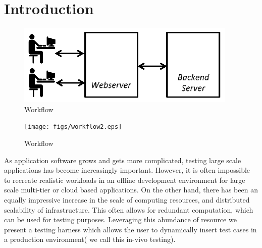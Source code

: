 
\section{Introduction}
\label{sec:intro}

\begin{figure}[t]
  \begin{center}
    \includegraphics[width=0.95\columnwidth]{figs/workflow.eps}
    \caption{Workflow}
    \label{fig:Normal workflow for most multi-tier service oriented systems}
  \end{center}
\end{figure}

\begin{figure}[t]
  \begin{center}
    \texttt{[image: figs/workflow2.eps]}
    \caption{Workflow}
    \label{fig:Backend wrapped around with Parakishan Run-time}
  \end{center}
\end{figure}

As application software grows and gets more complicated, testing large scale applications has become increasingly important. 
However, it is often impossible to recreate realistic workloads in an offline development environment for large scale multi-tier or cloud based applications.
On the other hand, there has been an equally impressive increase in the scale of computing resources, and distributed scalability of infrastructure.
This often allows for redundant computation, which can be used for testing purposes. 
Leveraging this abundance of resource we present a testing harness which allows the user to dynamically insert test cases in a production environment( we call this in-vivo testing).

